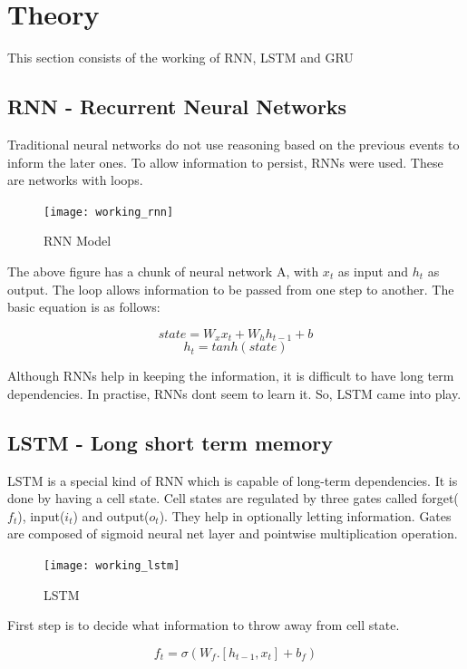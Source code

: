 \documentclass[runningheads]{llncs}
\begin{document}
\section{Theory}

This section consists of the working\cite{colah} of RNN, LSTM and GRU
 
\subsection{RNN - Recurrent Neural Networks}

Traditional neural networks do not use reasoning based on the previous events to inform the later ones. To allow information to persist, RNNs were used. These are networks with loops.

\begin{figure}[h!]
\centering
        \texttt{[image: working\_rnn]}
    \caption{RNN Model}
\end{figure}

The above figure has a chunk of neural network A, with $x_t$ as input and $h_t$ as output. The loop allows information to be passed from one step to another. The basic equation is as follows:

\[state = W_x x_t + W_h h_{t-1} + b \]
\[h_t = tanh(state) \]

Although RNNs help in keeping the information, it is difficult to have long term dependencies. In practise, RNNs dont seem to learn it. So, LSTM came into play.

\subsection{LSTM - Long short term memory}

LSTM is a special kind of RNN which is capable of long-term dependencies. It is done by having a cell state. Cell states are regulated by three gates called forget($f_t$), input($i_t$) and output($o_t$). They help in optionally letting information. Gates are composed of sigmoid neural net layer and pointwise multiplication operation.

\begin{figure}[h!]
\centering
        \texttt{[image: working\_lstm]}
    \caption{LSTM}
\end{figure}

First step is to decide what information to throw away from cell state.

\[f_t = \sigma(W_f.[h_{t-1},x_t] + b_f) \]
\end{document}
